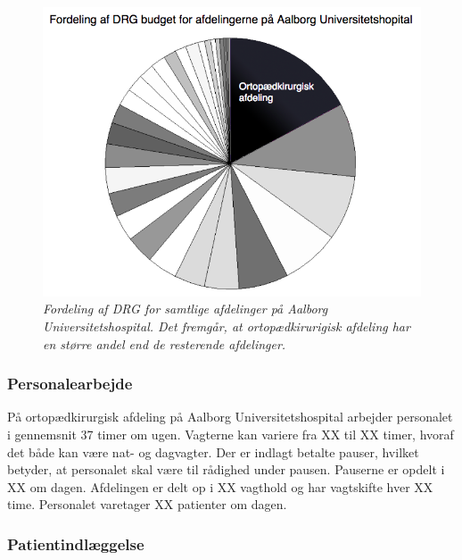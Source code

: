 \begin{figure}[H]
	\flushleft 
	\centering
	\includegraphics[scale=0.45]{figures/Ortopaeddiagram.png}
	\flushleft
	\caption{\textit{Fordeling af DRG for samtlige afdelinger på Aalborg Universitetshospital. Det fremgår, at ortopædkirurigisk afdeling har en større andel end de resterende afdelinger.}\cite{Rasmussen2016}}
	\label{DRG_budget}
\end{figure}


\subsubsection{Personalearbejde} 
På ortopædkirurgisk afdeling på Aalborg Universitetshospital arbejder personalet i gennemsnit 37 timer om ugen\cite{Danske2015}. Vagterne kan variere fra XX til XX timer, hvoraf det både kan være nat- og dagvagter. Der er indlagt betalte pauser, hvilket betyder, at personalet skal være til rådighed under pausen. Pauserne er opdelt i XX om dagen. Afdelingen er delt op i XX vagthold og har vagtskifte hver XX time. Personalet varetager XX patienter om dagen. 

\subsubsection{Patientindlæggelse}



